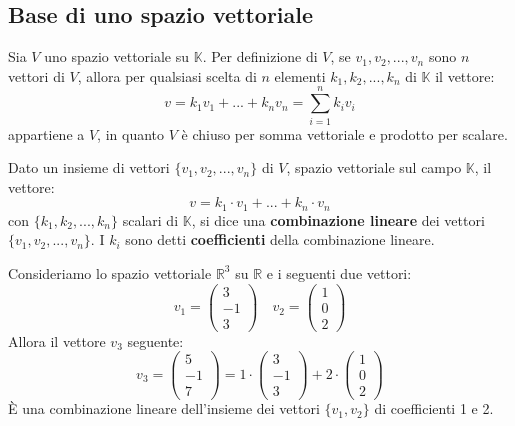 

\subsection{Base di uno spazio vettoriale}
Sia $V$ uno spazio vettoriale su $\mathbb{K}$.
Per definizione di $V$, se $v_1, v_2, ..., v_n$ sono $n$ vettori
di $V$, allora per qualsiasi scelta di $n$ elementi
$k_1, k_2, ..., k_n$ di $\mathbb{K}$ il vettore:
\begin{equation*}
	v = k_1 v_1 + ... + k_n v_n = \sum_{i=1}^n k_i v_i
\end{equation*}
appartiene a $V$, in quanto $V$ \`e chiuso per somma vettoriale
e prodotto per scalare.

\begin{defn}
	Dato un insieme di vettori $\{v_1, v_2, ..., v_n\}$ di $V$,
	spazio vettoriale sul campo $\mathbb{K}$, il vettore:
	\begin{equation*}
		v = k_1 \cdot v_1 + ... + k_n \cdot v_n
	\end{equation*}
	con $\{k_1, k_2, ..., k_n\}$ scalari di $\mathbb{K}$,
	si dice una \textbf{combinazione lineare} dei vettori
	$\{v_1, v_2, ..., v_n\}$. I $k_i$ sono detti \textbf{coefficienti}
	della combinazione lineare.
\end{defn}

\begin{example}
	Consideriamo lo spazio vettoriale $\mathbb{R}^3$ su $\mathbb{R}$ e i seguenti
	due vettori:
	\begin{equation*}
		v_1 = \begin{pmatrix}
			3 \\ -1 \\ 3
		\end{pmatrix}
		\quad
		v_2 = \begin{pmatrix}
			1 \\ 0 \\ 2
		\end{pmatrix}
	\end{equation*}
	Allora il vettore $v_3$ seguente:
	\begin{equation*}
		v_3 = \begin{pmatrix}
			5 \\ -1 \\ 7
		\end{pmatrix}
		= 1 \cdot \begin{pmatrix}
			3 \\ -1 \\ 3
		\end{pmatrix}
		+ 2 \cdot \begin{pmatrix}
			1 \\ 0 \\ 2
		\end{pmatrix}
	\end{equation*}
	\`E una combinazione lineare dell'insieme dei vettori $\{v_1, v_2\}$ di
	coefficienti 1 e 2.
\end{example}

